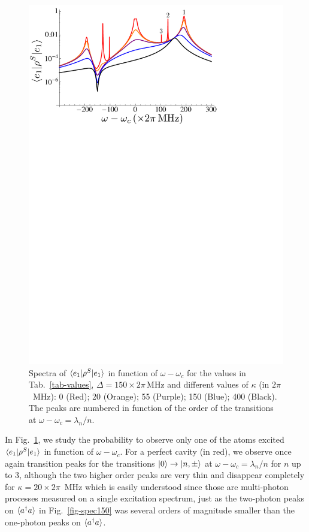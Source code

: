\begin{figure}
    \center
    \includegraphics[width=0.75 \textwidth]{Images/chap5/eg_kappa.pdf}
    \caption[$\prodsc{e_1}{\rho^S}{e_1}$ in function of $\omega-\omega_c$]{ Spectra of $\prodsc{e_1}{\rho^S}{e_1}$ in function of $\omega-\omega_c$ for the values in Tab.~\ref{tab-values}, $\Delta=150 \times 2\pi\,\mbox{MHz}$ and different values of $\kappa$ (in $2\pi$~MHz): 0 (Red); 20 (Orange); 55 (Purple); 150 (Blue); 400 (Black). The peaks are numbered in function of the order of the transitions at $\omega-\omega_c=\lambda_n/n$. }
    \label{fig-eg_kappa}
\end{figure}


In Fig.~\ref{fig-eg_kappa}, we study the probability to observe only one of the atoms excited $\prodsc{e_1}{\rho^S}{e_1}$ in function of $\omega-\omega_c$. For a perfect cavity (in red), we observe once again transition peaks for the transitions $| 0 \rangle \rightarrow | n,\pm \rangle$ at $\omega-\omega_c=\lambda_n/n$ for $n$ up to 3, although the two higher order peaks are very thin and disappear completely for $\kappa=20\times 2\pi$~MHz which is easily understood since those are multi-photon processes measured on a single excitation spectrum, just as the two-photon peaks on $\langle a^\dagger a \rangle$ in Fig.~\ref{fig-spec150} was several orders of magnitude smaller than the one-photon peaks on $\langle a^\dagger a \rangle$.


